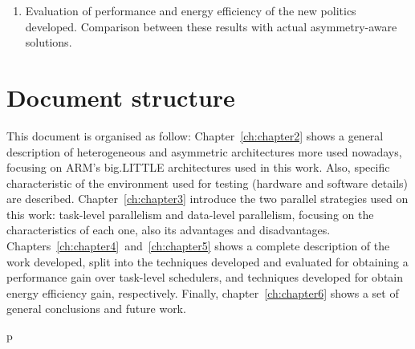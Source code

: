 \begin{enumerate}[T1.]
\item Evaluation of performance and energy efficiency of the new politics
  developed. Comparison between these results with  actual asymmetry-aware
  solutions. 
\end{enumerate}


\section*{Document structure}
This document is organised as follow:
Chapter~\ref{ch:chapter2} shows a general description of heterogeneous and
asymmetric architectures more used nowadays, focusing on ARM's big.LITTLE
architectures used in this work. Also, specific characteristic of the
environment used for testing (hardware and software details) are described.
Chapter~\ref{ch:chapter3} introduce the two parallel strategies used on
this work: task-level parallelism and data-level parallelism, focusing on
the characteristics of each one, also its advantages and disadvantages.
Chapters~\ref{ch:chapter4}~and~\ref{ch:chapter5} shows a complete
description of the work developed, split into the techniques developed and
evaluated for obtaining a performance gain over task-level schedulers, and
techniques developed for obtain energy efficiency gain, respectively.
Finally, chapter~\ref{ch:chapter6} shows a set of general conclusions and
future work.


p%


